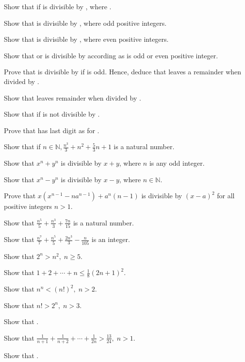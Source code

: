 \item Show that if  is divisible by , where .
\item Show that  is divisible by , where  odd positive integers.
\item Show that  is divisible by , where  even positive integers.
\item Show that  or  is divisible by  according as  is odd or even
  positive integer.
\item Prove that  is divisible by  if  is odd. Hence, deduce that  leaves
  a remainder  when divided by .
\item Show that  leaves remainder  when divided by .
\item Show that if  is not divisible by .
\item Prove that  has last digit as  for .
\item Show that if $n\in\mathbb{N}, \frac{n^3}{3} + n^2 + \frac{5}{3}n + 1$ is a natural number.
\item Show that $x^n + y^n$ is divisible by $x + y$, where $n$ is any odd integer.
\item Show that $x^n - y^n$ is divisible by $x - y$, where $n\in\mathbb{N}$.
\item Prove that $x(x^{n - 1} - na^{n - 1}) + a^n(n - 1)$ is divisible by $(x - a)^2$ for all positive integers $n > 1$.
\item Show that $\frac{n^5}{5} + \frac{n^3}{3} + \frac{7n}{15}$ is a natural number.
\item Show that $\frac{n^7}{7} + \frac{n^5}{5} + \frac{2n^3}{3} - \frac{n}{105}$ is an integer.
\item Show that $2^n > n^2,\;n\geq 5$.
\item Show that $1 + 2 + \cdots + n\leq \frac{1}{8}(2n + 1)^2$.
\item Show that $n^n < (n!)^2,\;n>2$.
\item Show that $n! > 2^n,\;n>3$.
\item Show that .
\item Show that $\frac{1}{n + 1} + \frac{1}{n + 2} + \cdots + \frac{1}{2n} > \frac{13}{24},\;n>1$.
\item Show that .

